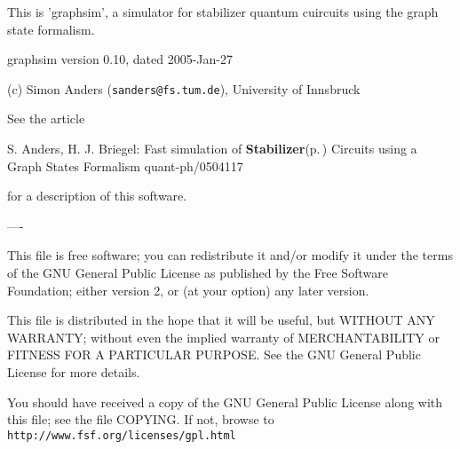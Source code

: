 This is 'graphsim', a simulator for stabilizer quantum cuircuits using the graph state formalism.

graphsim version 0.10, dated 2005-Jan-27

(c) Simon Anders ({\tt sanders@fs.tum.de}), University of Innsbruck

See the article

S. Anders, H. J. Briegel: Fast simulation of {\bf Stabilizer}{\rm (p.\,\pageref{structStabilizer})} Circuits using a Graph States Formalism quant-ph/0504117

for a description of this software.

----

This file is free software; you can redistribute it and/or modify it under the terms of the GNU General Public License as published by the Free Software Foundation; either version 2, or (at your option) any later version.

This file is distributed in the hope that it will be useful, but WITHOUT ANY WARRANTY; without even the implied warranty of MERCHANTABILITY or FITNESS FOR A PARTICULAR PURPOSE. See the GNU General Public License for more details.

You should have received a copy of the GNU General Public License along with this file; see the file COPYING. If not, browse to {\tt http://www.fsf.org/licenses/gpl.html} 